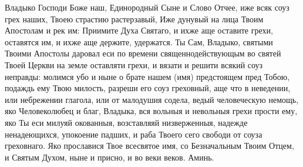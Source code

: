 \mychapterending

\begin{mymulticols}

 

 


Владыко Господи Боже наш, Единородный Сыне и Слово Отчее, иже всяк соуз грех наших, Твоею страстию растерзавый, Иже дунувый на лица Твоим Апостолам и рек им: Приимите Духа Святаго, и ихже аще оставите грехи, оставятся им, и ихже аще держите, удержатся. Ты Сам, Владыко, святыми Твоими Апостолы даровал еси по времени священнодействующым во святей Твоей Церкви на земле оставляти грехи, и вязати и решити всякий соуз неправды: молимся убо и ныне о брате нашем (имя) предстоящем пред Тобою, подаждь ему Твою милость, разреши его соуз греховный, аще что в неведении, или небрежении глагола, или от малодушия содела, ведый человеческую немощь, яко Человеколюбец и благ, Владыка, вся вольныя и невольныя грехи прости ему, яко Ты еси милуяй окованныя, возставляяй низверженныя, надежде ненадеющихся, упокоение падших, и раба Твоего сего свободи от соуза греховнаго. Яко прославися Твое всесвятое имя, со Безначальным Твоим Отцем, и Святым Духом, ныне и присно, и во веки веков. Аминь.

\end{mymulticols}

\mychapterending


 

